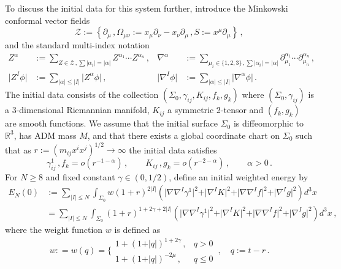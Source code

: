 \documentclass[11pt, a4paper]{amsart}
\numberwithin{equation}{section}
\numberwithin{theorem}{section}
\newcommand{\R}{\mathbb{R}}
\newcommand{\p}{\partial}
\newcommand{\mn}{{\mu \nu}}
\newcommand{\qv}{\vert q \vert}
\newcommand{\I}{\vert I \vert}
\begin{document}
To discuss the initial data for this system further, introduce the Minkowski conformal vector fields
$$ \mathcal{Z} := \left\lbrace \p_\mu \,, \Omega_\mn := x_\mu \p_\nu - x_\nu \p_\mu \,, S:=x^\mu \p_\mu \right\rbrace \,,$$
 and the standard multi-index notation
\begin{align*}
Z^\alpha &:= \sum_{Z \in \mathcal{Z} \,, \sum \vert \alpha_i \vert = \vert \alpha \vert} Z^{\alpha_1} \cdots Z^{\alpha_n} \,,  &\nabla^\alpha & := \sum_{\mu_i \in \{1,2,3\} \,, \sum \vert \alpha_i \vert = \vert \alpha \vert} \p_{\mu_1}^{\alpha_1} \cdots \p_{\mu_n}^{\alpha_n} \,, \\
\vert Z^I \phi \vert &:= \sum_{\vert \alpha \vert \leq \I} \vert Z^\alpha \phi \vert \,, & \vert \nabla^I \phi \vert & := \sum_{\vert \alpha \vert \leq \I} \vert \nabla^\alpha \phi \vert \,.
\end{align*}
The initial data consists of the collection $(\Sigma_0, \gamma_{ij}, K_{ij}, f_k, g_k)$ where $(\Sigma_0, \gamma_{ij})$ is a 3-dimensional Riemannian manifold, $K_{ij}$ a symmetric 2-tensor and $(f_k, g_k)$ are smooth functions. We assume that the initial surface $\Sigma_0$ is diffeomorphic to $\R^3$, has ADM mass $M$, and that there exists a global coordinate chart on $\Sigma_0$ such that as $r := ( m_{ij} x^i x^j )^{1/2} \to \infty$ the initial data satisfies
\begin{equation}
\gamma^1_{ij} \,, f_k = o(r^{-1-\alpha}) \,,  \qquad K_{ij}\,, g_k  = o(r^{-2-\alpha}) \,, \qquad  \alpha >0 \,. \label{eq:intro-decay-id}
\end{equation}
For $N \geq 8$ and fixed constant $\gamma \in (0, 1/2)$, define an initial weighted energy by
\begin{equation} \begin{split} E_N(0) 
& := \sum_{\vert I \vert \leq N}  \int_{\Sigma_0}  w  (1+r)^{2\I} \left( \vert \nabla \nabla^I \gamma^1 \vert^2 + \vert \nabla^I K \vert^2 + \vert \nabla \nabla^I f \vert^2 + \vert \nabla^I g\vert^2 \right) d^3 x \\
& = \sum_{\vert I \vert \leq N}  \int_{\Sigma_0}  (1+r)^{1+2\gamma+2\I} \left( \vert \nabla \nabla^I \gamma^1 \vert^2 + \vert \nabla^I K \vert^2 + \vert \nabla \nabla^I f \vert^2 + \vert \nabla^I g\vert^2 \right) d^3 x \,,
 \end{split} \label{eq:intro-initial-energy} 
\end{equation}
where the weight function $w$ is defined as 
\begin{equation}
w: = w(q) = \Bigg\lbrace \begin{array}{ll}
1+(1+\qv)^{1+2\gamma} \,, & q>0 \\
1+(1+\qv)^{-2 \mu} \,, & q\leq 0
\end{array} \,, \quad q := t-r \,. \label{eq:intro-weight}
\end{equation}
\end{document}
